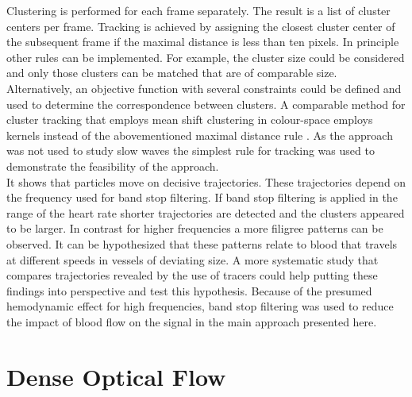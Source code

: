 Clustering is performed for each frame separately. The result is a list of cluster centers per frame. Tracking is achieved by assigning the closest cluster center of the subsequent frame if the maximal distance is less than ten pixels. In principle other rules can be implemented. For example, the cluster size could be considered and only those clusters can be matched that are of comparable size. Alternatively, an objective function with several constraints could be defined and used to determine the correspondence between clusters. A comparable method for cluster tracking that employs mean shift clustering in colour-space employs kernels instead of the abovementioned maximal distance rule \parencite{kumar2020tracking}. As the approach was not used to study slow waves the simplest rule for tracking was used to demonstrate the feasibility of the approach.\\
 It shows that particles move on decisive trajectories. These trajectories depend on the frequency used for band stop filtering. If band stop filtering is applied in the range of the heart rate shorter trajectories are detected and the clusters appeared to be larger. In contrast for higher frequencies a more filigree patterns can be observed. It can be hypothesized that these patterns relate to blood that travels at different speeds in vessels of deviating size. A more systematic study that compares trajectories revealed by the use of tracers could help putting these findings into perspective and test this hypothesis. Because of the presumed hemodynamic effect for high frequencies, band stop filtering was used to reduce the impact of blood flow on the signal in the main approach presented here.

\section{Dense Optical Flow}
\label{chapter_optical_flow}


